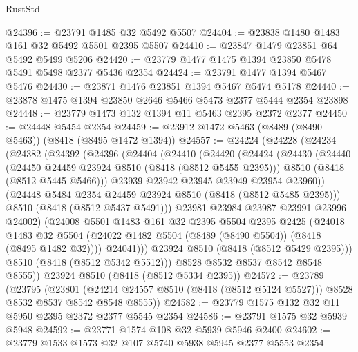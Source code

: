 \begin{lexlean}{RustStd}
\begin{coremodule}
@24396 := @23791 @1485 @32 @5492 @5507
@24404 := @23838 @1480 @1483 @161 @32 @5492 @5501 @2395 @5507
@24410 := @23847 @1479 @23851 @64 @5492 @5499 @5206
@24420 := @23779 @1477 @1475 @1394 @23850 @5478 @5491 @5498 @2377 @5436 @2354
@24424 := @23791 @1477 @1394 @5467 @5476
@24430 := @23871 @1476 @23851 @1394 @5467 @5474 @5178
@24440 := @23878 @1475 @1394 @23850 @2646 @5466 @5473 @2377 @5444 @2354 @23898
@24448 := @23779 @1473 @132 @1394 @11 @5463 @2395 @2372 @2377
@24450 := @24448 @5454 @2354
@24459 := @23912 @1472 @5463 (@8489 (@8490 @5463)) (@8418 (@8495 @1472 @1394))
@24557 := @24224
    (@24228
      (@24234
        (@24382
          (@24392
            (@24396
              (@24404
                (@24410
                  (@24420
                    (@24424
                      (@24430
                        (@24440
                          (@24450 @24459 @23924 @8510 (@8418 (@8512 @5455 @2395)))
                          @8510
                          (@8418 (@8512 @5445 @5466)))
                        @23939
                        @23942
                        @23945
                        @23949
                        @23954
                        @23960))
                    (@24448 @5484 @2354 @24459 @23924 @8510 (@8418 (@8512 @5485 @2395)))
                    @8510
                    (@8418 (@8512 @5437 @5491)))
                  @23981
                  @23984
                  @23987
                  @23991
                  @23996
                  @24002)
                (@24008
                  @5501
                  @1483
                  @161
                  @32
                  @2395
                  @5504
                  @2395
                  @2425
                  (@24018
                    @1483
                    @32
                    @5504
                    (@24022 @1482 @5504 (@8489 (@8490 @5504)) (@8418 (@8495 @1482 @32))))
                  @24041)))
            @23924
            @8510
            (@8418 (@8512 @5429 @2395)))
          @8510
          (@8418 (@8512 @5342 @5512)))
        @8528
        @8532
        @8537
        @8542
        @8548
        @8555))
    @23924
    @8510
    (@8418 (@8512 @5334 @2395))
@24572 := @23789
    (@23795
      (@23801
        (@24214 @24557 @8510 (@8418 (@8512 @5124 @5527)))
        @8528
        @8532
        @8537
        @8542
        @8548
        @8555))
@24582 := @23779 @1575 @132 @32 @11 @5950 @2395 @2372 @2377 @5545 @2354
@24586 := @23791 @1575 @32 @5939 @5948
@24592 := @23771 @1574 @108 @32 @5939 @5946 @2400
@24602 := @23779 @1533 @1573 @32 @107 @5740 @5938 @5945 @2377 @5553 @2354

\end{coremodule}
\end{lexlean}
